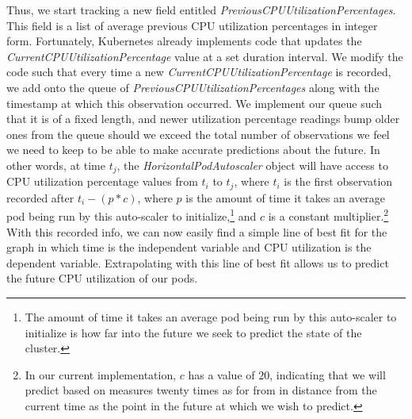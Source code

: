 Thus, we start tracking a new field entitled
\textit{PreviousCPUUtilizationPercentages}. This field is a list of average previous CPU
utilization percentages in integer form. Fortunately, Kubernetes already
implements code that updates the \textit{CurrentCPUUtilizationPercentage} value
at a set duration interval. We modify the code such that every time a new
\textit{CurrentCPUUtilizationPercentage} is recorded, we add onto the queue of
\textit{PreviousCPUUtilizationPercentages} along with the timestamp at which
this observation occurred. We implement our queue such that it
is of a fixed length, and newer utilization percentage readings bump older ones
from the queue should we exceed the total number of observations we feel we need
to keep to be able to make accurate predictions about the future. In other words, at time
$t_{j}$, the \textit{HorizontalPodAutoscaler} object will have access to
CPU utilization percentage values from $t_{i}$ to $t_{j}$, where $t_{i}$ is the
first observation recorded after $t_{i} - (p * c)$, where $p$ is the
amount of time it takes an
average pod being run by this auto-scaler to initialize,\footnote{The
amount of time it takes an
average pod being run by this auto-scaler to initialize is how far into the
future we seek to predict the state of the cluster.} and $c$ is a constant
multiplier.\footnote{In our current implementation, $c$ has a value of
$20$, indicating that we will predict based on measures twenty times as for from
in distance from the current time as the point in
the future at which we wish to predict.} With this recorded info,
we can now easily find a simple line of best fit
for the graph in which time is the independent variable and CPU utilization is
the dependent variable. Extrapolating with this line of best fit allows us to
predict the future CPU utilization of our pods.
